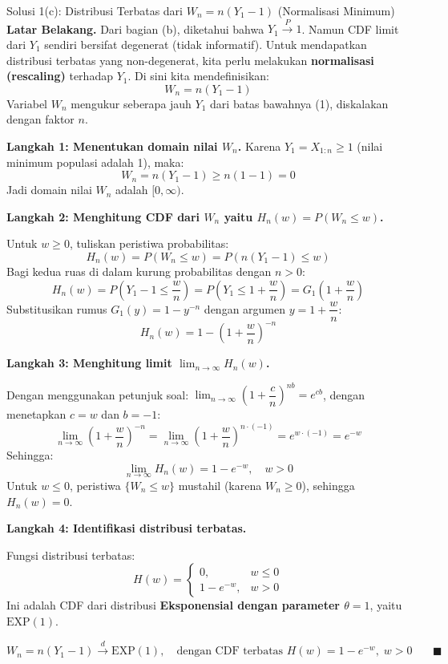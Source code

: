 \documentclass[10pt,twoside]{article}
\begin{document}
\begin{solbox}{Solusi 1(c): Distribusi Terbatas dari $W_n = n(Y_1 - 1)$ (Normalisasi Minimum)}
\textbf{Latar Belakang.}
Dari bagian (b), diketahui bahwa $Y_1 \xrightarrow{P} 1$. Namun CDF limit dari $Y_1$ sendiri bersifat degenerat (tidak informatif). Untuk mendapatkan distribusi terbatas yang non-degenerat, kita perlu melakukan \textbf{normalisasi (rescaling)} terhadap $Y_1$. Di sini kita mendefinisikan:
\[
W_n = n(Y_1 - 1)
\]
Variabel $W_n$ mengukur seberapa jauh $Y_1$ dari batas bawahnya (1), diskalakan dengan faktor $n$.

\textbf{Langkah 1: Menentukan domain nilai $W_n$.}
Karena $Y_1 = X_{1:n} \ge 1$ (nilai minimum populasi adalah 1), maka:
\[
W_n = n(Y_1 - 1) \ge n(1 - 1) = 0
\]
Jadi domain nilai $W_n$ adalah $[0, \infty)$.

\textbf{Langkah 2: Menghitung CDF dari $W_n$ yaitu $H_n(w) = P(W_n \le w)$.}

Untuk $w \ge 0$, tuliskan peristiwa probabilitas:
\[
H_n(w) = P(W_n \le w) = P(n(Y_1 - 1) \le w)
\]
Bagi kedua ruas di dalam kurung probabilitas dengan $n > 0$:
\[
H_n(w) = P\left(Y_1 - 1 \le \frac{w}{n}\right) = P\left(Y_1 \le 1 + \frac{w}{n}\right) = G_1\left(1 + \frac{w}{n}\right)
\]
Substitusikan rumus $G_1(y) = 1 - y^{-n}$ dengan argumen $y = 1 + \dfrac{w}{n}$:
\[
H_n(w) = 1 - \left(1 + \frac{w}{n}\right)^{-n}
\]

\textbf{Langkah 3: Menghitung limit $\lim_{n \to \infty} H_n(w)$.}

Dengan menggunakan petunjuk soal: $\lim_{n \to \infty} \left(1 + \dfrac{c}{n}\right)^{nb} = e^{cb}$, dengan menetapkan $c = w$ dan $b = -1$:
\[
\lim_{n \to \infty} \left(1 + \frac{w}{n}\right)^{-n} = \lim_{n \to \infty} \left(1 + \frac{w}{n}\right)^{n \cdot (-1)} = e^{w \cdot (-1)} = e^{-w}
\]
Sehingga:
\[
\lim_{n \to \infty} H_n(w) = 1 - e^{-w}, \quad w > 0
\]
Untuk $w \le 0$, peristiwa $\{W_n \le w\}$ mustahil (karena $W_n \ge 0$), sehingga $H_n(w) = 0$.

\textbf{Langkah 4: Identifikasi distribusi terbatas.}

Fungsi distribusi terbatas:
\[
H(w) = \begin{cases} 0, & w \le 0 \\ 1 - e^{-w}, & w > 0 \end{cases}
\]
Ini adalah CDF dari distribusi \textbf{Eksponensial dengan parameter $\theta = 1$}, yaitu $\mathrm{EXP}(1)$.

\[
\boxed{W_n = n(Y_1 - 1) \xrightarrow{d} \mathrm{EXP}(1), \quad \text{dengan CDF terbatas } H(w) = 1 - e^{-w},\; w > 0} \qquad \blacksquare
\]
\end{solbox}
\end{document}
